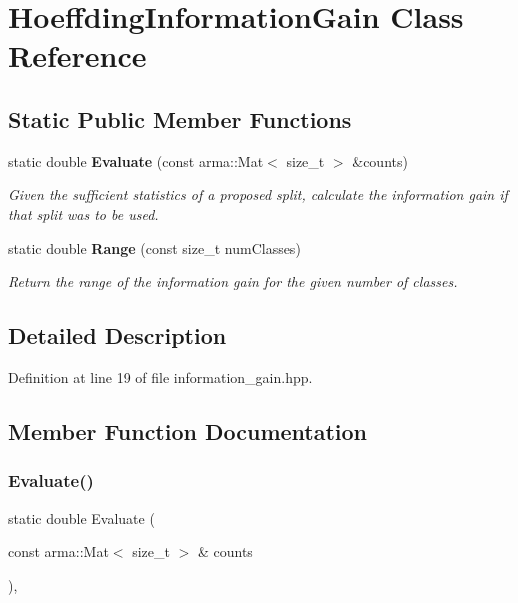 \section{Hoeffding\+Information\+Gain Class Reference}
\label{classmlpack_1_1tree_1_1HoeffdingInformationGain}
\subsection*{Static Public Member Functions}
\begin{DoxyCompactItemize}
\item 
static double \textbf{ Evaluate} (const arma\+::\+Mat$<$ size\+\_\+t $>$ \&counts)
\begin{DoxyCompactList}\small\item\em Given the sufficient statistics of a proposed split, calculate the information gain if that split was to be used. \end{DoxyCompactList}\item 
static double \textbf{ Range} (const size\+\_\+t num\+Classes)
\begin{DoxyCompactList}\small\item\em Return the range of the information gain for the given number of classes. \end{DoxyCompactList}\end{DoxyCompactItemize}


\subsection{Detailed Description}


Definition at line 19 of file information\+\_\+gain.\+hpp.



\subsection{Member Function Documentation}
\mbox{\label{classmlpack_1_1tree_1_1HoeffdingInformationGain_a578c636308efbd492ea30e62f05f4d63}} 
\subsubsection{Evaluate()}
{\footnotesize\ttfamily static double Evaluate (\begin{DoxyParamCaption}\item[{const arma\+::\+Mat$<$ size\+\_\+t $>$ \&}]{counts }\end{DoxyParamCaption})\hspace{0.3cm}{\ttfamily [inline]}, {\ttfamily [static]}}




